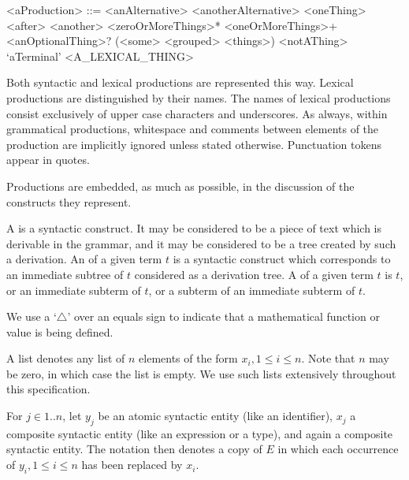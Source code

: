 \documentclass[makeidx]{article}
\begin{document}

\begin{grammar}\color{commentaryColor}
<aProduction> ::= <anAlternative>
  \alt <anotherAlternative>
  \alt <oneThing> <after> <another>
  \alt <zeroOrMoreThings>*
  \alt <oneOrMoreThings>+
  \alt <anOptionalThing>?
  \alt (<some> <grouped> <things>)
  \alt \gtilde<notAThing>
  \alt `aTerminal'
  \alt <A\_LEXICAL\_THING>
\end{grammar}

\LMHash{}%
Both syntactic and lexical productions are represented this way.
Lexical productions are distinguished by their names.
The names of lexical productions consist exclusively of
upper case characters and underscores.
As always, within grammatical productions,
whitespace and comments between elements of the production
are implicitly ignored unless stated otherwise.
Punctuation tokens appear in quotes.

\LMHash{}%
Productions are embedded, as much as possible,
in the discussion of the constructs they represent.

\LMHash{}%
A  is a syntactic construct.
It may be considered to be a piece of text which is derivable in the grammar,
and it may be considered to be a tree created by such a derivation.
An  of a given term $t$ is a syntactic construct
which corresponds to an immediate subtree of $t$
considered as a derivation tree.
A  of a given term $t$ is $t$,
or an immediate subterm of $t$,
or a subterm of an immediate subterm of $t$.

\LMHash{}%
\BlindDefineSymbol{\stackrel{\triangle}{=}}%
We use a `$\triangle$' over an equals sign to indicate that
a mathematical function or value is being defined.

\LMHash{}%
A list  denotes any list of
$n$ elements of the form $x_i, 1 \le i \le n$.
Note that $n$ may be zero, in which case the list is empty.
We use such lists extensively throughout this specification.

%
\LMHash{}%
For $j \in 1 .. n$,
let $y_j$ be an atomic syntactic entity (like an identifier),
$x_j$ a composite syntactic entity (like an expression or a type),
and  again a composite syntactic entity.
The notation
then denotes a copy of $E$
in which each occurrence of $y_i, 1 \le i \le n$ has been replaced by $x_i$.
\end{document}
